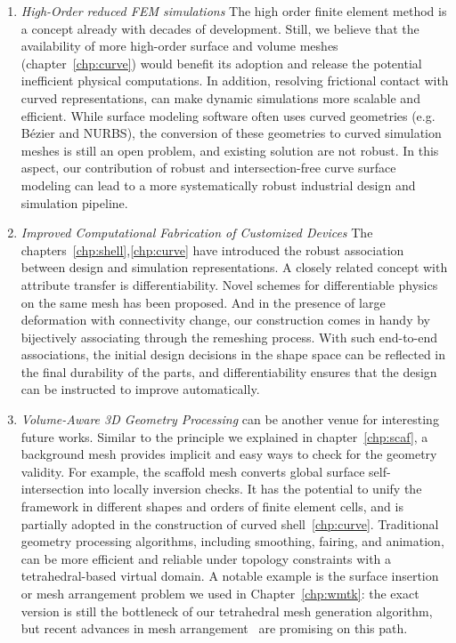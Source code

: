 \begin{enumerate}
\item \emph{High-Order reduced FEM simulations}
The high order finite element method is a concept already with decades of development. Still, we believe that the availability of more high-order surface and volume meshes (chapter~\ref{chp:curve}) would benefit its adoption and release the potential inefficient physical computations. In addition, resolving frictional contact with curved representations, \cite{ferguson2022high} can make dynamic simulations more scalable and efficient. 
While surface modeling software often uses curved geometries (e.g. B{\'e}zier and NURBS), the conversion of these geometries to curved simulation meshes is still an open problem, and existing solution are not robust. In this aspect, our contribution of robust and intersection-free curve surface modeling can lead to a more systematically robust industrial design and simulation pipeline.

\item \emph{Improved Computational Fabrication of Customized Devices}
The chapters~\ref{chp:shell},\ref{chp:curve} have introduced the robust association between design and simulation representations. A closely related concept with attribute transfer is differentiability. Novel schemes for differentiable physics on the same mesh has been proposed. And in the presence of large deformation with connectivity change, our construction comes in handy by bijectively associating through the remeshing process. 
With such end-to-end associations, the initial design decisions in the shape space can be reflected in the final durability of the parts, and differentiability ensures that the design can be instructed to improve automatically.  

\item \emph{Volume-Aware 3D Geometry Processing}
can be another venue for interesting future works. 
Similar to the principle we explained in chapter~\ref{chp:scaf}, a background mesh provides implicit and easy ways to check for the geometry validity. For example, the scaffold mesh converts global surface self-intersection into locally inversion checks. It has the potential to unify the framework in different shapes and orders of finite element cells, and is partially adopted in the construction of curved shell~\ref{chp:curve}. Traditional geometry processing algorithms, including smoothing, fairing, and animation, can be more efficient and reliable under topology constraints with a tetrahedral-based virtual domain. A notable example is the surface insertion or mesh arrangement problem we used in Chapter~\ref{chp:wmtk}: the exact version is still the bottleneck of our tetrahedral mesh generation algorithm, but recent advances in mesh arrangement~\cite{Hu:2019:fTetWild,zhou2016mesh,ember2022} are promising on this path.


\end{enumerate}
